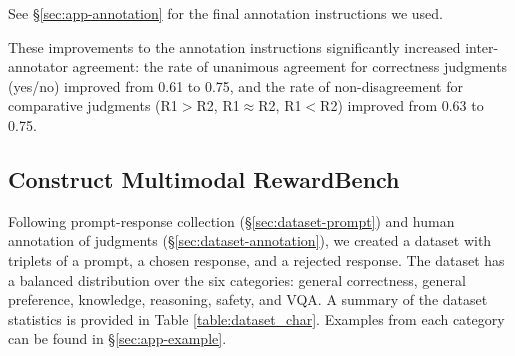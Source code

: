 See \S \ref{sec:app-annotation} for the final annotation instructions we used.

These improvements to the annotation instructions significantly increased inter-annotator agreement: the rate of unanimous agreement for correctness judgments (yes/no) improved from 0.61 to 0.75, and the rate of non-disagreement for comparative judgments (R1$>$R2, R1$\approx$R2, R1$<$R2) improved from 0.63 to 0.75.


\subsection{Construct Multimodal RewardBench}

Following prompt-response collection (\S \ref{sec:dataset-prompt}) and human annotation of judgments (\S \ref{sec:dataset-annotation}), we created a dataset with \totalsamples triplets of a prompt, a chosen response, and a rejected response. The dataset has a balanced distribution over the six categories: general correctness, general preference, knowledge, reasoning, safety, and VQA.
A summary of the dataset statistics is provided in Table \ref{table:dataset_char}.
Examples from each category can be found in \S \ref{sec:app-example}.